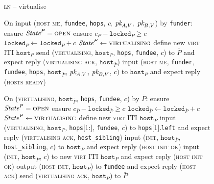 \begin{figure}[H]
  \begin{processbox}{\textsc{ln} -- virtualise}
    \begin{algorithmic}[1]
      \State On input (\textsc{host me}, \texttt{fundee}, \texttt{hops}, $c$,
      $\textit{pk}_{A, V}$, $\textit{pk}_{B, V}$) by \texttt{funder}:
      \Indent
        \State ensure $\textit{State}^P = \textsc{open}$
        \State ensure $c_P - \texttt{locked}_P \geq c$
        \State $\texttt{locked}_P \gets \texttt{locked}_P + c$
        \State $\textit{State}^P \gets \textsc{virtualising}$
        \State define new \textsc{virt} ITI $\texttt{host}_P$
        \State send (\textsc{virtualising}, $\texttt{host}_P$, \texttt{hops},
        \texttt{fundee}, $c$) to $\bar{P}$ and expect reply
        (\textsc{virtualising ack}, $\texttt{host}_{\bar{P}}$)
        \State input (\textsc{host me}, \texttt{funder}, \texttt{fundee},
        \texttt{hops}, $\texttt{host}_{\bar{P}}$, $\textit{pk}_{A, V}$, $\textit{pk}_{B, V}$, $c$)
        to $\texttt{host}_P$ and expect reply (\textsc{hosts ready})
      \EndIndent
      \Statex

      \State On (\textsc{virtualising}, $\texttt{host}_{\bar{P}}$,
      \texttt{hops}, \texttt{fundee}, $c$) by $\bar{P}$:
      \Indent
        \State ensure $\textit{State}^P = \textsc{open}$
        \State ensure $c_{\bar{P}} - \texttt{locked}_{\bar{P}} \geq c$
        \State $\texttt{locked}_{\bar{P}} \gets \texttt{locked}_{\bar{P}} + c$
        \State $\textit{State}^P \gets \textsc{virtualising}$
         
          \State define new \textsc{virt} ITI $\texttt{host}_P$
          \State input (\textsc{virtualising}, $\texttt{host}_P$,
          \texttt{hops}[1:], \texttt{fundee}, $c$) to
          \texttt{hops}[1].\texttt{left} and expect reply (\textsc{virtualising
          ack}, \texttt{host\_sibling})
          \State input (\textsc{init}, $\texttt{host}_{\bar{P}}$,
          \texttt{host\_sibling}, $c$) to $\texttt{host}_P$ and expect reply
          (\textsc{host init ok})
        \Else \: 
          \State input (\textsc{init}, $\texttt{host}_{\bar{P}}$, $c$) to new
          \textsc{virt} ITI $\texttt{host}_P$ and expect reply (\textsc{host init
          ok})
          \State output (\textsc{host init}, $\texttt{host}_P$) to
          \texttt{fundee} and expect reply (\textsc{host ack})
        \EndIf
        \State send (\textsc{virtualising ack}, $\texttt{host}_P$) to $\bar{P}$
      \EndIndent
      \Statex


\end{algorithmic}
\end{processbox}
\end{figure}
